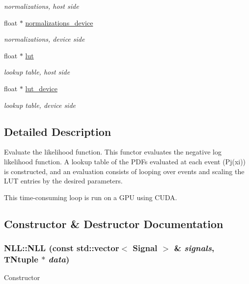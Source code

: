 \begin{DoxyCompactItemize}
\begin{DoxyCompactList}\small\item\em normalizations, host side \item\end{DoxyCompactList}\item 
\hypertarget{classNLL_a4d3d3ec4af173cad23a44679b0b20a76}{
float $\ast$ \hyperlink{classNLL_a4d3d3ec4af173cad23a44679b0b20a76}{normalizations\_\-device}}
\label{classNLL_a4d3d3ec4af173cad23a44679b0b20a76}

\begin{DoxyCompactList}\small\item\em normalizations, device side \item\end{DoxyCompactList}\item 
\hypertarget{classNLL_af2874b0225be1a364da0cf82adf1a551}{
float $\ast$ \hyperlink{classNLL_af2874b0225be1a364da0cf82adf1a551}{lut}}
\label{classNLL_af2874b0225be1a364da0cf82adf1a551}

\begin{DoxyCompactList}\small\item\em lookup table, host side \item\end{DoxyCompactList}\item 
\hypertarget{classNLL_a01b4aad101d84ec9071d97107cf70824}{
float $\ast$ \hyperlink{classNLL_a01b4aad101d84ec9071d97107cf70824}{lut\_\-device}}
\label{classNLL_a01b4aad101d84ec9071d97107cf70824}

\begin{DoxyCompactList}\small\item\em lookup table, device side \item\end{DoxyCompactList}\end{DoxyCompactItemize}


\subsection{Detailed Description}
Evaluate the likelihood function. This functor evaluates the negative log likelihood function. A lookup table of the PDFs evaluated at each event (Pj(xi)) is constructed, and an evaluation consists of looping over events and scaling the LUT entries by the desired parameters.

This time-\/consuming loop is run on a GPU using CUDA. 

\subsection{Constructor \& Destructor Documentation}
\hypertarget{classNLL_a55bf637cd44c2909738f39136b554f7d}{
\subsubsection[{NLL}]{\setlength{\rightskip}{0pt plus 5cm}NLL::NLL (const std::vector$<$ {\bf Signal} $>$ \& {\em signals}, \/  TNtuple $\ast$ {\em data})}}
\label{classNLL_a55bf637cd44c2909738f39136b554f7d}
Constructor


